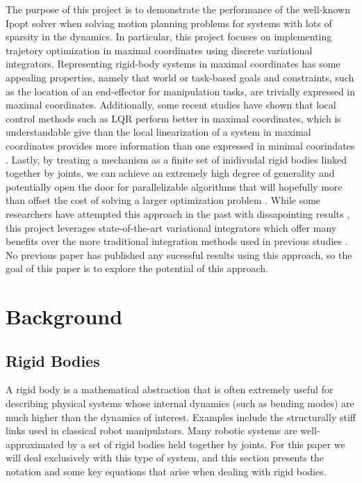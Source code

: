 \documentclass[conference]{IEEEtran}
\begin{document}
The purpose of this project is to demonstrate the performance of the well-known Ipopt solver
when solving motion planning problems for systems with lots of sparsity in the dynamics. 
In particular, this project focuses on implementing trajetory optimization in maximal 
coordinates using discrete variational integrators. Representing rigid-body systems in 
maximal coordinates has some appealing properties, namely that world or task-based goals 
and constraints, such as the location of an end-effector for manipulation tasks, are 
trivially expressed in maximal coordinates. Additionally, some recent studies have shown
that local control methods such as LQR perform better in maximal coordinates, which is 
understandable give than the local linearization of a system in maximal coordinates provides
more information than one expressed in minimal coorindates \cite{brudigam_LinearTime_2020,
brudigam2021linear}.  Lastly, by treating a 
mechanism as a finite set of inidivudal rigid bodies linked together by joints, we can 
achieve an extremely high degree of generality and potentially open the door for 
parallelizable algorithms that will hopefully more than offset the cost of solving a larger
optimization problem \cite{baraff_Lineartime_1996}. While some researchers have attempted 
this approach in the past with
dissapointing results \cite{knemeyer2020minor,}, this project leverages state-of-the-art 
variational integrators 
which offer many benefits over the more traditional integration methods used in previous 
studies \cite{manchester_Variational_2017,brudigam_LinearTime_2020,marsden2001discrete}. 
No previous paper has published any sucessful results using this approach, so 
the goal of this paper is to explore the potential of this approach.


\section{Background}
\subsection{Rigid Bodies}
A rigid body is a mathematical abstraction that is often extremely useful for describing 
physical systems whose internal dynamics (such as bending modes) are much higher than the 
dynamics of interest. Examples include the structurally stiff links used in classical 
robot manipulators. Many robotic systems are well-approximated by a set of rigid bodies 
held together by joints. For this paper we will deal exclusively with this type of system,
and this section presents the notation and some key equations that arise when dealing with
rigid bodies.
\end{document}

